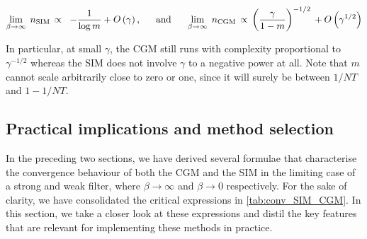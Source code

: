 \begin{equation*}
    \lim_{\beta \rightarrow \infty} \;  n_\text{SIM} \, \propto \;\;  -\frac{1}{\log m} + O\left(\gamma\right), \;\; \quad \text{and} \quad \;\; \lim_{\beta \rightarrow \infty} \;  n_\text{CGM} \, \propto \, \left(\frac{\gamma}{1 - m} \right)^{-1/2} \, + O\left(\gamma^{1/2}\right) 
\end{equation*}


In particular, at small $\gamma$, the CGM still runs with complexity proportional to $\gamma^{-1/2}$ whereas the SIM does not involve $\gamma$ to a negative power at all. Note that $m$ cannot scale arbitrarily close to zero or one, since it will surely be between $1/NT$ and $1 - 1/NT$. 


\subsection{Practical implications and method selection}

\label{sec:GSR_convergence_implications}

In the preceding two sections, we have derived several formulae that characterise the convergence behaviour of both the CGM and the SIM in the limiting case of a strong and weak filter, where $\beta \rightarrow \infty$ and $\beta \rightarrow 0$ respectively. For the sake of clarity, we have consolidated the critical expressions in \cref{tab:conv_SIM_CGM}. In this section, we take a closer look at these expressions and distil the key features that are relevant for implementing these methods in practice.


